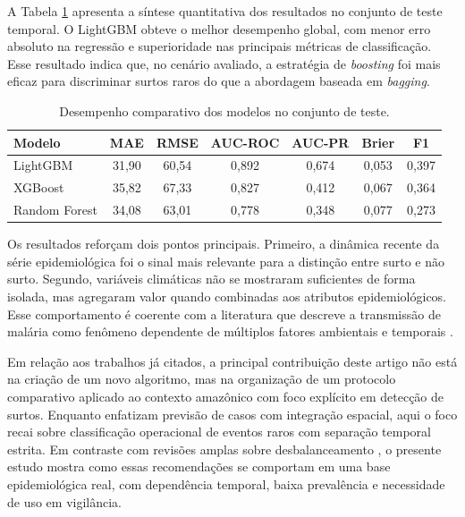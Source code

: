 
A Tabela \ref{tab:metricas} apresenta a s\'intese quantitativa dos resultados no conjunto de teste temporal. O LightGBM obteve o melhor desempenho global, com menor erro absoluto na regress\~ao e superioridade nas principais m\'etricas de classifica\c{c}\~ao. Esse resultado indica que, no cen\'ario avaliado, a estrat\'egia de \textit{boosting} foi mais eficaz para discriminar surtos raros do que a abordagem baseada em \textit{bagging}.

\begin{table}[H]
\centering
\caption{Desempenho comparativo dos modelos no conjunto de teste.}
\label{tab:metricas}
\tabelafonte
\begin{tabular}{lcccccc}
\toprule
Modelo & MAE & RMSE & AUC-ROC & AUC-PR & Brier & F1 \\
\midrule
LightGBM & 31,90 & 60,54 & 0,892 & 0,674 & 0,053 & 0,397 \\
XGBoost & 35,82 & 67,33 & 0,827 & 0,412 & 0,067 & 0,364 \\
Random Forest & 34,08 & 63,01 & 0,778 & 0,348 & 0,077 & 0,273 \\
\bottomrule
\end{tabular}
\end{table}

Os resultados refor\c{c}am dois pontos principais. Primeiro, a din\^amica recente da s\'erie epidemiol\'ogica foi o sinal mais relevante para a distin\c{c}\~ao entre surto e n\~ao surto. Segundo, vari\'aveis clim\'aticas n\~ao se mostraram suficientes de forma isolada, mas agregaram valor quando combinadas aos atributos epidemiol\'ogicos. Esse comportamento \'e coerente com a literatura que descreve a transmiss\~ao de mal\'aria como fen\^omeno dependente de m\'ultiplos fatores ambientais e temporais \cite{arisco2025impact}.

Em rela\c{c}\~ao aos trabalhos j\'a citados, a principal contribui\c{c}\~ao deste artigo n\~ao est\'a na cria\c{c}\~ao de um novo algoritmo, mas na organiza\c{c}\~ao de um protocolo comparativo aplicado ao contexto amaz\^onico com foco expl\'icito em detec\c{c}\~ao de surtos. Enquanto  enfatizam previs\~ao de casos com integra\c{c}\~ao espacial, aqui o foco recai sobre classifica\c{c}\~ao operacional de eventos raros com separa\c{c}\~ao temporal estrita. Em contraste com revis\~oes amplas sobre desbalanceamento \cite{5128907,branco2015surveypredictivemodellingimbalanced,johnson2019survey}, o presente estudo mostra como essas recomenda\c{c}\~oes se comportam em uma base epidemiol\'ogica real, com depend\^encia temporal, baixa preval\^encia e necessidade de uso em vigil\^ancia.

